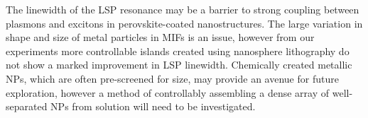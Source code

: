 The linewidth of the LSP resonance may be a barrier to strong coupling between plasmons and excitons in perovskite-coated nanostructures. The large variation in shape and size of metal particles in MIFs is an issue, however from our experiments more controllable islands created using nanosphere lithography do not show a marked improvement in LSP linewidth. Chemically created metallic NPs, which are often pre-screened for size, may provide an avenue for future exploration, however a method of controllably assembling a dense array of well-separated NPs from solution will need to be investigated.